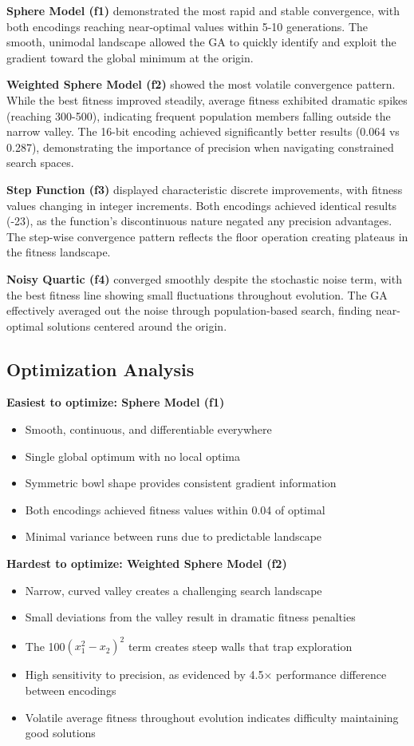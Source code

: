 \documentclass[journal,12pt,onecolumn]{IEEEtran}
\begin{document}
\textbf{Sphere Model (f1)} demonstrated the most rapid and stable convergence, with both encodings reaching near-optimal values within 5-10 generations. The smooth, unimodal landscape allowed the GA to quickly identify and exploit the gradient toward the global minimum at the origin.

\textbf{Weighted Sphere Model (f2)} showed the most volatile convergence pattern. While the best fitness improved steadily, average fitness exhibited dramatic spikes (reaching 300-500), indicating frequent population members falling outside the narrow valley. The 16-bit encoding achieved significantly better results (0.064 vs 0.287), demonstrating the importance of precision when navigating constrained search spaces.

\textbf{Step Function (f3)} displayed characteristic discrete improvements, with fitness values changing in integer increments. Both encodings achieved identical results (-23), as the function's discontinuous nature negated any precision advantages. The step-wise convergence pattern reflects the floor operation creating plateaus in the fitness landscape.

\textbf{Noisy Quartic (f4)} converged smoothly despite the stochastic noise term, with the best fitness line showing small fluctuations throughout evolution. The GA effectively averaged out the noise through population-based search, finding near-optimal solutions centered around the origin.

\subsection{Optimization Analysis}
\textbf{Easiest to optimize: Sphere Model (f1)}
\begin{itemize}
    \item Smooth, continuous, and differentiable everywhere
    \item Single global optimum with no local optima
    \item Symmetric bowl shape provides consistent gradient information
    \item Both encodings achieved fitness values within 0.04 of optimal
    \item Minimal variance between runs due to predictable landscape
\end{itemize}

\textbf{Hardest to optimize: Weighted Sphere Model (f2)}
\begin{itemize}
    \item Narrow, curved valley creates a challenging search landscape
    \item Small deviations from the valley result in dramatic fitness penalties
    \item The 100$(x_1^2 - x_2)^2$ term creates steep walls that trap exploration
    \item High sensitivity to precision, as evidenced by 4.5× performance difference between encodings
    \item Volatile average fitness throughout evolution indicates difficulty maintaining good solutions
\end{itemize}
\end{document}
